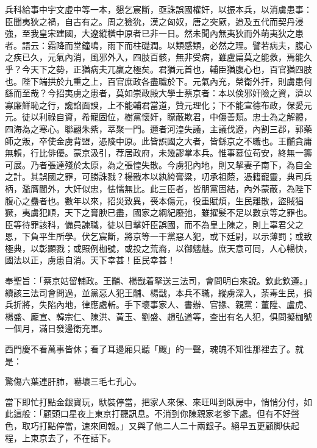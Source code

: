 \begin{myquote}[\markfont]
兵科給事中宇文虛中等一本，懇乞宸斷，亟誅誤國權奸，以振本兵，以消虜患事：臣聞夷狄之禍，自古有之。周之獫狁，漢之匈奴，唐之突厥，迨及五代而契丹浸強，至我皇宋建國，大遼縱橫中原者已非一日。然未聞內無夷狄而外萌夷狄之患者。語云：霜降而堂鐘鳴，雨下而柱礎潤。以類感類，必然之理。譬若病夫，腹心之疾已久，元氣內消，風邪外入，四肢百骸，無非受病，雖盧扁莫之能救，焉能久乎？{}今天下之勢，正猶病夫兀羸之極矣。君猶元首也，輔臣猶腹心也，百官猶四肢也。陛下端拱於九重之上，百官庶政各盡職於下。元氣內充，榮衛外扞，則虜患何繇而至哉？今招夷虜之患者，莫如崇政殿大學士蔡京者：本以倹邪奸險之資，濟以寡廉鮮恥之行，讒諂面諛，上不能輔君當道，贊元理化；下不能宣德布政，保愛元元。徒以利祿自資，希寵固位，樹黨懷奸，矇蔽欺君，中傷善類。忠士為之解體，四海為之寒心。聯翩朱紫，萃聚一門。邇者河湟失議，主議伐遼，內割三郡，郭藥師之叛，卒使金虜背盟，憑陵中原。此皆誤國之大者，皆繇京之不職也。王黼貪庸無賴，行比俳優。蒙京汲引，荐居政府，未幾謬掌本兵。惟事慕位苟安，終無一籌可展。乃者張達殘於太原，為之張惶失散。今虜犯內地，則又挈妻子南下，為自全之計。其誤國之罪，可勝誅戮？楊戩本以紈絝膏粱，叨承祖蔭，憑籍寵靈，典司兵柄，濫膺閫外，大奸似忠，怯懦無比。此三臣者，皆朋黨固結，內外蒙蔽，為陛下腹心之蠱者也。數年以來，招災致異，䘮本傷元，役重賦煩，生民離散，盜賊猖獗，夷虜犯順，天下之膏腴已盡，國家之綱紀廢弛，雖擢髮不足以數京等之罪也。臣等待罪該科，備員諫職，徒以目擊奸臣誤國，而不為皇上陳之，則上辜君父之恩，下負平生所學。伏乞宸斷，將京等一干黨惡人犯，或下廷尉，以示薄罰；或致極典，以彰顯戮；或照例枷號，或投之荒裔，以御魑魅。庶天意可囘，人心暢快，國法以正，虜患自消。天下幸甚！臣民幸甚！

奉聖旨：「蔡京姑留輔政。王黼、楊戩着拏送三法司，會問明白來說。欽此欽遵。」續該三法司會問過，並黨惡人犯王黼、楊戩，本兵不職，縱虜深入，荼毒生民，損兵折將，失陷內地，律應處斬。手下壞事家人、書辦、官掾、親黨：董陞、盧虎、楊盛、龐宣、韓宗仁、陳洪、黃玉、劉盛、趙弘道等，查出有名人犯，俱問擬枷號一個月，滿日發邊衛充軍。
\end{myquote}

西門慶不看萬事皆休；看了耳邊廂只聽「颼」的一聲，魂魄不知徃那裡去了。就是：

\begin{myquote}
驚傷六葉連肝肺，嚇壞三毛七孔心。
\end{myquote}

當下即忙打點金銀寶玩，馱裝停當，把家人來保、來旺叫到臥房中，悄悄分付，如此這般：「顧頭口星夜上東京打聽訊息。不消到你陳親家老爹下處。但有不好聲色，取巧打點停當，速來囘報。」又與了他二人二十兩銀子。絕早五更顧脚伕起程，上東京去了，不在話下。

